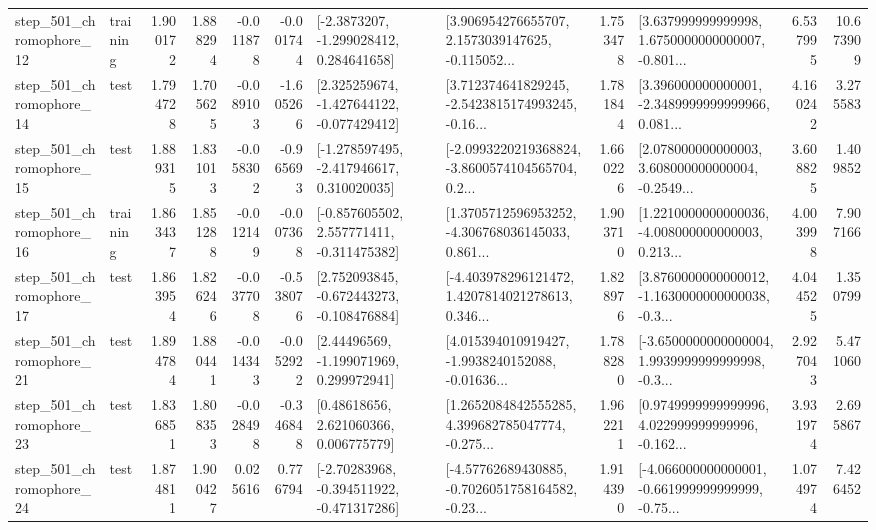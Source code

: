 \begin{tabular}{llrrrrllrlrr}
  step\_501\_chromophore\_12 &  training &      1.900172 &    1.888294 &     -0.011878 & -0.001744 &     [-2.3873207, -1.299028412, 0.284641658] &  [3.906954276655707, 2.1573039147625, -0.115052... &       1.753478 &  [3.637999999999998, 1.6750000000000007, -0.801... &            6.537995 &         10.673909 \\
  step\_501\_chromophore\_14 &      test &      1.794728 &    1.705625 &     -0.089103 & -1.605266 &   [2.325259674, -1.427644122, -0.077429412] &  [3.712374641829245, -2.5423815174993245, -0.16... &       1.781844 &  [3.396000000000001, -2.3489999999999966, 0.081... &            4.160242 &          3.275583 \\
  step\_501\_chromophore\_15 &      test &      1.889315 &    1.831013 &     -0.058302 & -0.965693 &   [-1.278597495, -2.417946617, 0.310020035] &  [-2.0993220219368824, -3.8600574104565704, 0.2... &       1.660226 &  [2.078000000000003, 3.608000000000004, -0.2549... &            3.608825 &          1.409852 \\
  step\_501\_chromophore\_16 &  training &      1.863437 &    1.851288 &     -0.012149 & -0.007368 &   [-0.857605502, 2.557771411, -0.311475382] &  [1.3705712596953252, -4.306768036145033, 0.861... &       1.903710 &  [1.2210000000000036, -4.008000000000003, 0.213... &            4.003998 &          7.907166 \\
  step\_501\_chromophore\_17 &      test &      1.863954 &    1.826246 &     -0.037708 & -0.538076 &   [2.752093845, -0.672443273, -0.108476884] &  [-4.403978296121472, 1.4207814021278613, 0.346... &       1.828976 &  [3.8760000000000012, -1.1630000000000038, -0.3... &            4.044525 &          1.350799 \\
  step\_501\_chromophore\_21 &      test &      1.894784 &    1.880441 &     -0.014343 & -0.052922 &     [2.44496569, -1.199071969, 0.299972941] &  [4.015394010919427, -1.9938240152088, -0.01636... &       1.788280 &  [-3.6500000000000004, 1.9939999999999998, -0.3... &            2.927043 &          5.471060 \\
  step\_501\_chromophore\_23 &      test &      1.836851 &    1.808353 &     -0.028498 & -0.346848 &      [0.48618656, 2.621060366, 0.006775779] &  [1.2652084842555285, 4.399682785047774, -0.275... &       1.962211 &  [0.9749999999999996, 4.022999999999996, -0.162... &            3.931974 &          2.695867 \\
  step\_501\_chromophore\_24 &      test &      1.874811 &    1.900427 &      0.025616 &  0.776794 &   [-2.70283968, -0.394511922, -0.471317286] &  [-4.57762689430885, -0.7026051758164582, -0.23... &       1.914390 &  [-4.066000000000001, -0.661999999999999, -0.75... &            1.074974 &          7.426452 \\

\end{tabular}
